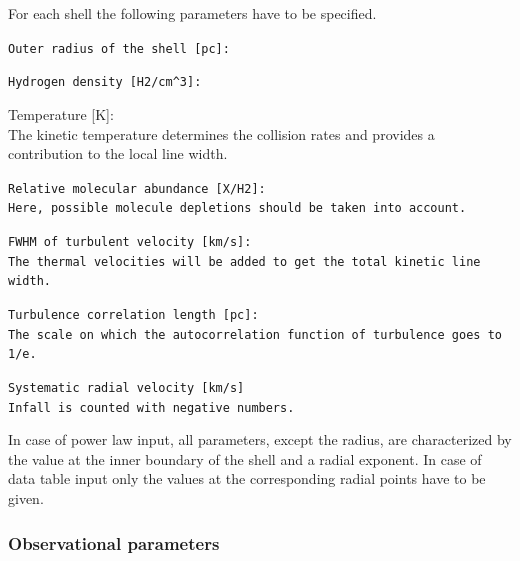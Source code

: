 \noindent{}For each shell the following parameters have to be specified.
\begin{description}
\item{}\tt Outer radius of the shell [pc]:
\item{}\tt Hydrogen density [H2/cm\^{}3]:
\item{\tt} Temperature [K]:\\ \rm
The kinetic temperature determines the collision rates and provides
a contribution to the local line width.
\item{}\tt Relative molecular abundance [X/H2]: \\ \rm
Here, possible molecule depletions should be taken into account.
\item{}\tt FWHM of turbulent velocity [km/s]:\\ \rm
The thermal velocities will be added to get the total kinetic line width.
\item{}\tt Turbulence correlation length [pc]:\\ \rm
The scale on which the autocorrelation function of turbulence
goes to 1/e.
\item{}\tt Systematic radial velocity [km/s]\\ \rm
Infall is counted with negative numbers.
\end{description}
In case of power law input, all parameters, except the radius, are 
characterized by the value at the inner boundary of the shell and a 
radial exponent. In case of data table input only the values at the
corresponding radial points have to be given.

\subsubsection{Observational parameters}

